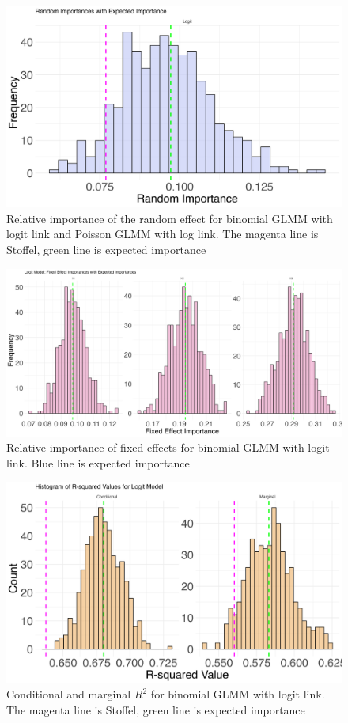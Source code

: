 
\begin{figure}[H]
  \centering
    \includegraphics[width=0.7\linewidth]{Figures/Simulation study/Random_logit.png}
    \caption{Relative importance of the random effect for binomial GLMM with logit link and Poisson GLMM with log link. The magenta line is Stoffel, green line is expected importance}
    \label{fig:relimp_random_logit}
\end{figure}


\begin{figure}[H]
    \centering
      \includegraphics[width=0.7\linewidth]{Figures/Simulation study/Fixed_logit.png}
      \caption{Relative importance of fixed effects for binomial GLMM with logit link. Blue line is expected importance}
      \label{fig:relimp_binomial_logit_fixed}
  \end{figure}
  \begin{figure}[H]\ContinuedFloat
    \centering
    \includegraphics[width=0.7\linewidth]{Figures/Simulation study/R2_logit.png}
    \caption{Conditional and marginal $R^2$ for binomial GLMM with logit link. The magenta line is Stoffel, green line is expected importance}
      \label{fig:relimp_binomial_logit_r2}
  \end{figure}

